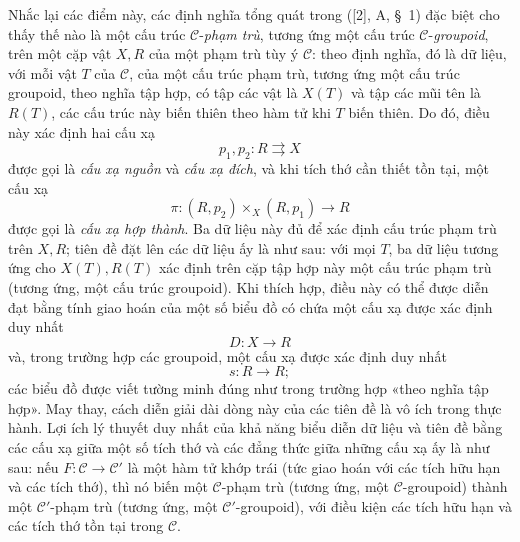 Nhắc lại các điểm này, các định nghĩa tổng quát trong ([2], A, \S~1) đặc biệt
cho thấy thế nào là một cấu trúc $\mathcal C$-\emph{phạm trù}, tương ứng một
cấu trúc $\mathcal C$-\emph{groupoid}, trên một cặp vật $X,R$ của một phạm trù
tùy ý $\mathcal C$: theo định nghĩa, đó là dữ liệu, với mỗi vật $T$ của
$\mathcal C$, của một cấu trúc phạm trù, tương ứng một cấu trúc groupoid, theo
nghĩa tập hợp, có tập các vật là $X(T)$ và tập các mũi tên là $R(T)$, các cấu
trúc này \guillemotleft biến thiên theo hàm tử\guillemotright{} khi $T$ biến
thiên. Do đó, điều này xác định hai cấu xạ
\[
  p_1,p_2:R\rightrightarrows X
\]
được gọi là \emph{cấu xạ nguồn} và \emph{cấu xạ đích}, và khi tích thớ cần
thiết tồn tại, một cấu xạ
\[
  \pi:(R,p_2)\times_X(R,p_1)\longrightarrow R
\]
được gọi là \emph{cấu xạ hợp thành}. Ba dữ liệu này đủ để xác định cấu trúc
phạm trù trên $X,R$; tiên đề đặt lên các dữ liệu ấy là như sau: với mọi $T$,
ba dữ liệu tương ứng cho $X(T),R(T)$ xác định trên cặp tập hợp này một cấu
trúc phạm trù (tương ứng, một cấu trúc groupoid). Khi thích hợp, điều này có
thể được diễn đạt bằng tính giao hoán của một số biểu đồ có chứa một cấu xạ
được xác định duy nhất
\[
  D:X\longrightarrow R
\]
và, trong trường hợp các groupoid, một cấu xạ được xác định duy nhất
\[
  s:R\longrightarrow R;
\]
các biểu đồ được viết tường minh đúng như trong trường hợp «theo nghĩa tập
hợp». May thay, cách diễn giải dài dòng này của các tiên đề là vô ích trong
thực hành. Lợi ích lý thuyết duy nhất của khả năng biểu diễn dữ liệu và tiên
đề bằng các cấu xạ giữa một số tích thớ và các đẳng thức giữa những cấu xạ ấy
là như sau: nếu $F:\mathcal C\to\mathcal C'$ là một hàm tử khớp trái (tức giao
hoán với các tích hữu hạn và các tích thớ), thì nó biến một
$\mathcal C$-phạm trù (tương ứng, một $\mathcal C$-groupoid) thành một
$\mathcal C'$-phạm trù (tương ứng, một $\mathcal C'$-groupoid), với điều kiện
các tích hữu hạn và các tích thớ tồn tại trong $\mathcal C$.


